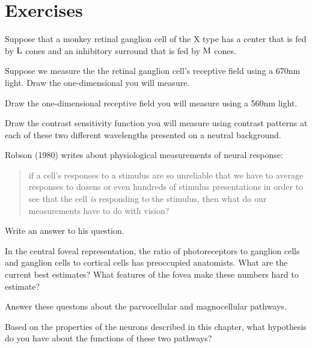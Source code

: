 %
%
\newpage
\section*{Exercises}

\be %

\item Suppose that a monkey retinal ganglion cell of the X type has
a center that is fed by $\mbox{L}$ cones and an
inhibitory surround that is fed by $\mbox{M}$ cones.

 \be

 \item  Suppose we measure the the retinal
ganglion cell's receptive field using a 670nm light.
Draw the one-dimensional you will measure.

 \item Draw the one-dimensional receptive field you will measure
using a 560nm light.

 \item Draw the contrast sensitivity function
you will measure using contrast patterns
at each of these two different wavelengths presented on a
neutral background.

 \ee

\item  Robson (1980) writes about physiological measurements
of neural response:

\begin{quote}
if a cell's responses to a stimulus are so unreliable
that we have to average responses to dozens or even hundreds of
stimulus presentations in order to see that the cell {\em is}
responding to the stimulus, then what do our
measurements have to do with vision?
\end{quote}

Write an answer to his question.

\item  In the central foveal representation,
the ratio of photoreceptors
to ganglion cells and ganglion cells to cortical
cells has preoccupied anatomists.
What are the current best estimates?
What features of the fovea make these numbers
hard to estimate?

\item Answer these questons about the 
parvocellular and magnocellular pathways.

\be
\item Based on the properties of the
neurons described in this chapter,
what hypothesis do you have about the functions
of these two pathways?

